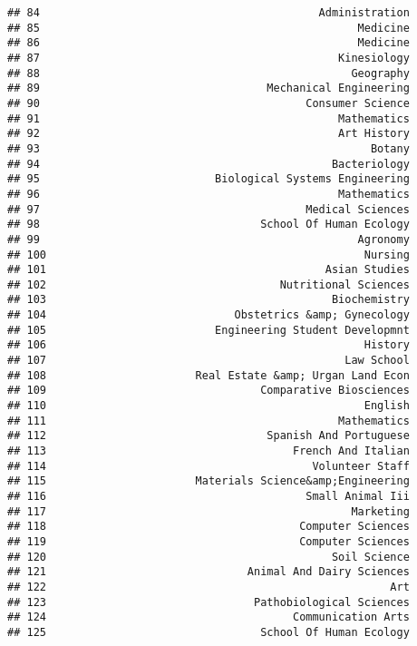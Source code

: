 \documentclass[
]{article}
\begin{document}
\begin{verbatim}
## 84                                           Administration
## 85                                                 Medicine
## 86                                                 Medicine
## 87                                              Kinesiology
## 88                                                Geography
## 89                                   Mechanical Engineering
## 90                                         Consumer Science
## 91                                              Mathematics
## 92                                              Art History
## 93                                                   Botany
## 94                                             Bacteriology
## 95                           Biological Systems Engineering
## 96                                              Mathematics
## 97                                         Medical Sciences
## 98                                  School Of Human Ecology
## 99                                                 Agronomy
## 100                                                 Nursing
## 101                                           Asian Studies
## 102                                    Nutritional Sciences
## 103                                            Biochemistry
## 104                             Obstetrics &amp; Gynecology
## 105                          Engineering Student Developmnt
## 106                                                 History
## 107                                              Law School
## 108                       Real Estate &amp; Urgan Land Econ
## 109                                 Comparative Biosciences
## 110                                                 English
## 111                                             Mathematics
## 112                                  Spanish And Portuguese
## 113                                      French And Italian
## 114                                         Volunteer Staff
## 115                       Materials Science&amp;Engineering
## 116                                        Small Animal Iii
## 117                                               Marketing
## 118                                       Computer Sciences
## 119                                       Computer Sciences
## 120                                            Soil Science
## 121                               Animal And Dairy Sciences
## 122                                                     Art
## 123                                Pathobiological Sciences
## 124                                      Communication Arts
## 125                                 School Of Human Ecology

\end{verbatim}
\end{document}
